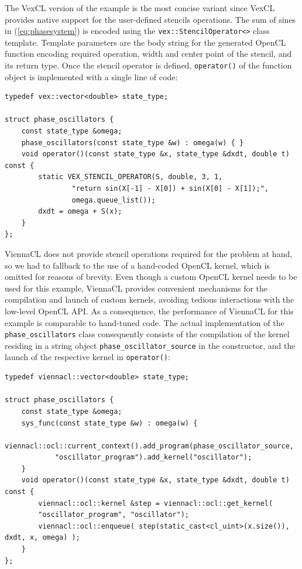 \documentclass[final]{siamltex}
\newcommand{\code}[1]{\lstinline|#1|}
\newcommand{\eqref}[1]{(\ref{#1})}
\begin{document}
The VexCL version of the example is the most
concise variant since VexCL provides native support for the user-defined
stencils operations. The sum of sines in \eqref{eq:phasesystem} is encoded
using the \code{vex::StencilOperator<>} class template. Template parameters
are the body string for the generated OpenCL function encoding required
operation, width and center point of the stencil, and its return type. Once the
stencil operator is defined, \code{operator()} of the function object is implemented
with a single line of code:
\begin{lstlisting}
typedef vex::vector<double> state_type;

struct phase_oscillators {
    const state_type &omega;
    phase_oscillators(const state_type &w) : omega(w) { }
    void operator()(const state_type &x, state_type &dxdt, double t) const {
        static VEX_STENCIL_OPERATOR(S, double, 3, 1,
                "return sin(X[-1] - X[0]) + sin(X[0] - X[1]);",
                omega.queue_list());
        dxdt = omega + S(x);
    }
};
\end{lstlisting}


ViennaCL does not provide stencil operations required for the problem at hand, so we had
to fallback to the use of a hand-coded OpenCL kernel, which is omitted for
reasons of brevity.  Even though a custom OpenCL kernel needs to be used for
this example, ViennaCL provides convenient mechanisms for the compilation and
launch of custom kernels, avoiding tedious interactions with the low-level
OpenCL API.  As a consequence, the performance of ViennaCL for this example is
comparable to hand-tuned code.  The actual implementation of the
\code{phase_oscillators} class consequently consists of the compilation of the
kernel residing in a string object \code{phase_oscillator_source} in the
constructor, and the launch of the respective kernel in \code{operator()}:
\begin{lstlisting}
typedef viennacl::vector<double> state_type;

struct phase_oscillators {
    const state_type &omega;
    sys_func(const state_type &w) : omega(w) {
        viennacl::ocl::current_context().add_program(phase_oscillator_source,
            "oscillator_program").add_kernel("oscillator");
    }
    void operator()(const state_type &x, state_type &dxdt, double t) const {
        viennacl::ocl::kernel &step = viennacl::ocl::get_kernel(
		"oscillator_program", "oscillator");
        viennacl::ocl::enqueue( step(static_cast<cl_uint>(x.size()), dxdt, x, omega) );
    }
};
\end{lstlisting}
\end{document}
